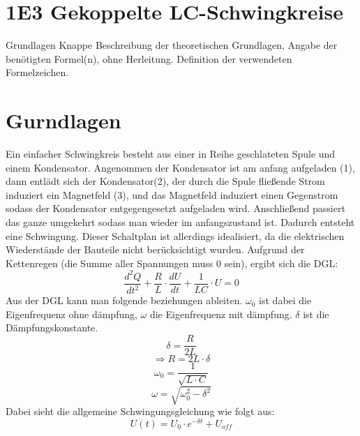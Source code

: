\documentclass[twoside]{protokoll}
\begin{document}
 
\section{1E3 Gekoppelte LC-Schwingkreise}

\begin{aufgabe}{Grundlagen}
  Knappe Beschreibung der theoretischen Grundlagen, Angabe der
  benötigten Formel(n), ohne Herleitung. Definition der verwendeten
  Formelzeichen.
\end{aufgabe}
\section{Gurndlagen}
Ein einfacher Schwingkreis besteht aus einer in Reihe geschlateten Spule und einem Kondensator.
Angenommen der Kondensator ist am anfang aufgeladen (1),
dann entlädt sich der Kondensator(2), der durch die Spule fließende Strom induziert ein Magnetfeld (3), und das Magnetfeld induziert einen Gegenstrom sodass der Kondensator entgegengesetzt aufgeladen wird.
Anschließend passiert das ganze umgekehrt sodass man wieder im anfangszustand ist.
Dadurch entsteht eine Schwingung.
Dieser Schaltplan ist allerdings idealisiert, da die elektrischen Wiederstände der Bauteile nicht berücksichtigt wurden.
Aufgrund der Kettenregen (die Summe aller Spannungen muss 0 sein), ergibt sich die DGL:
\begin{equation}
    \frac{d^2 Q}{dt^2} + \frac{R}{L} \cdot \frac{d U}{dt} + \frac{1}{LC} \cdot U = 0
\end{equation}
Aus der DGL kann man folgende beziehungen ableiten. $\omega_0$ ist dabei die Eigenfrequenz ohne dämpfung, $\omega$ die Eigenfrequenz mit dämpfung.
$\delta$ ist die Dämpfungskonstante.
\begin{equation}
    \delta = \frac{R}{2L}
\end{equation}
\begin{equation}
    \Rightarrow R = 2 L \cdot \delta
\end{equation}
\begin{equation}
    \omega_0 = \frac{1}{\sqrt{L \cdot C}}
\end{equation}
\begin{equation}
    \omega = \sqrt{\omega_0^2 - \delta^2}
\end{equation}
Dabei sieht die allgemeine Schwingungsgleichung wie folgt aus:
\begin{equation}
    U(t) = U_0 \cdot e ^ {-\delta t} + U_{off}
\end{equation}
\end{document}
